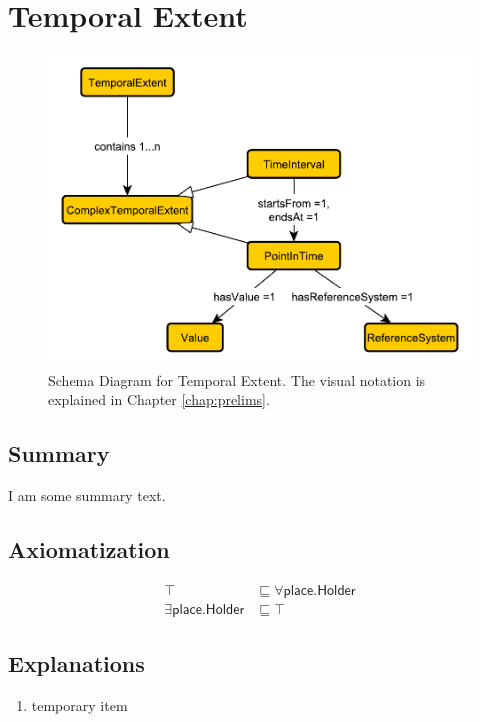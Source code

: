 \section{Temporal Extent}
\label{sec:Temporal}
\begin{figure}[h!]
\begin{center}
\includegraphics[width=.8\textwidth]{figures/temporal}
\end{center}
\caption{Schema Diagram for Temporal Extent. The visual notation is explained in Chapter \ref{chap:prelims}.}
\label{fig:Temporal}
\end{figure}
\subsection{Summary}
\label{sum:Temporal}
I am some summary text.

\subsection{Axiomatization}
\label{axs:Temporal}
\begin{align}
\top &\sqsubseteq \forall\textsf{place.Holder} \\ 
\exists\textsf{place.Holder} &\sqsubseteq \top 
\end{align}

\subsection{Explanations}
\label{exp:Temporal}
\begin{enumerate}
\item temporary item
\end{enumerate}

